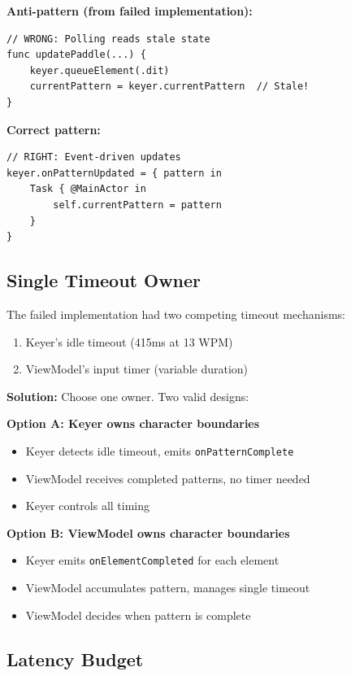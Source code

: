 \documentclass[a4paper,10pt,fleqn]{article}
\begin{document}
\textbf{Anti-pattern (from failed implementation):}

\begin{verbatim}
// WRONG: Polling reads stale state
func updatePaddle(...) {
    keyer.queueElement(.dit)
    currentPattern = keyer.currentPattern  // Stale!
}
\end{verbatim}

\textbf{Correct pattern:}

\begin{verbatim}
// RIGHT: Event-driven updates
keyer.onPatternUpdated = { pattern in
    Task { @MainActor in
        self.currentPattern = pattern
    }
}
\end{verbatim}

\subsection{Single Timeout Owner}

The failed implementation had two competing timeout mechanisms:

\begin{enumerate}
\item Keyer's idle timeout (415ms at 13 WPM)
\item ViewModel's input timer (variable duration)
\end{enumerate}

\textbf{Solution:} Choose one owner. Two valid designs:

\textbf{Option A: Keyer owns character boundaries}
\begin{itemize}
\item Keyer detects idle timeout, emits \texttt{onPatternComplete}
\item ViewModel receives completed patterns, no timer needed
\item Keyer controls all timing
\end{itemize}

\textbf{Option B: ViewModel owns character boundaries}
\begin{itemize}
\item Keyer emits \texttt{onElementCompleted} for each element
\item ViewModel accumulates pattern, manages single timeout
\item ViewModel decides when pattern is complete
\end{itemize}

\subsection{Latency Budget}
\end{document}
